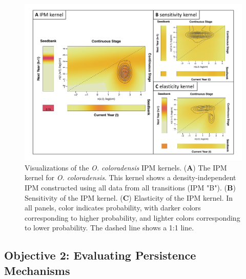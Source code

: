 \documentclass[12pt, letterpaper]{article}
\begin{document}
\begin{figure}[h!]
  \centering
  \includegraphics[width=\textwidth]{figures/KernelMultipanelFigure.pdf}
  \caption{\internallinenumbers Visualizations of the \textit{O. coloradensis} IPM kernels. (\textbf{A}) The IPM kernel for \textit{O. coloradensis}. This kernel shows a density-independent IPM constructed using all data from all transitions (IPM "B"). (\textbf{B}) Sensitivity of the IPM kernel. (\textbf{C}) Elasticity of the IPM kernel. In all panels, color indicates probability, with darker colors corresponding to higher probability, and lighter colors corresponding to lower probability. The dashed line shows a 1:1 line. }
  \label{fig:IPMKernel}
\end{figure} 
\subsection{Objective 2: Evaluating Persistence Mechanisms}
\end{document}
